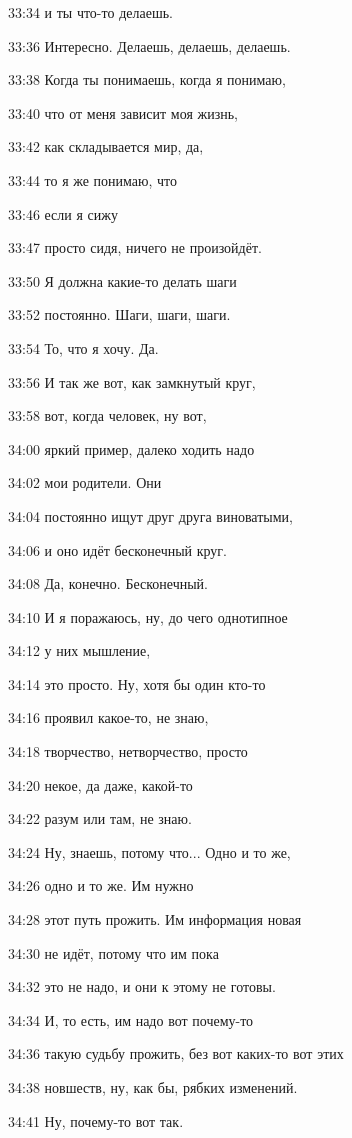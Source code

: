 33:34
и ты что-то делаешь.

33:36
Интересно. Делаешь, делаешь, делаешь.

33:38
Когда ты понимаешь, когда я понимаю,

33:40
что от меня зависит моя жизнь,

33:42
как складывается мир, да,

33:44
то я же понимаю, что

33:46
если я сижу

33:47
просто сидя, ничего не произойдёт.

33:50
Я должна какие-то делать шаги

33:52
постоянно. Шаги, шаги, шаги.

33:54
То, что я хочу. Да.

33:56
И так же вот, как замкнутый круг,

33:58
вот, когда человек, ну вот,

34:00
яркий пример, далеко ходить надо

34:02
мои родители. Они

34:04
постоянно ищут друг друга виноватыми,

34:06
и оно идёт бесконечный круг.

34:08
Да, конечно. Бесконечный.

34:10
И я поражаюсь, ну, до чего однотипное

34:12
у них мышление,

34:14
это просто. Ну, хотя бы один кто-то

34:16
проявил какое-то, не знаю,

34:18
творчество, нетворчество, просто

34:20
некое, да даже, какой-то

34:22
разум или там, не знаю.

34:24
Ну, знаешь, потому что... Одно и то же,

34:26
одно и то же. Им нужно

34:28
этот путь прожить. Им информация новая

34:30
не идёт, потому что им пока

34:32
это не надо, и они к этому не готовы.

34:34
И, то есть, им надо вот почему-то

34:36
такую судьбу прожить, без вот каких-то вот этих

34:38
новшеств, ну, как бы, рябких изменений.

34:41
Ну, почему-то вот так.

